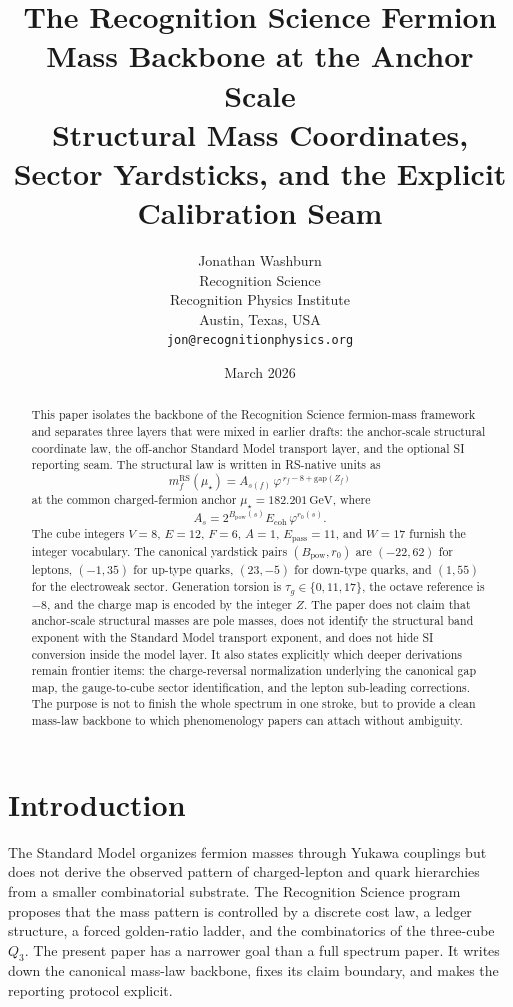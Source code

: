 \documentclass[11pt]{article}
\title{The Recognition Science Fermion Mass Backbone at the Anchor Scale\\
\large Structural Mass Coordinates, Sector Yardsticks, and the Explicit Calibration Seam}
\author{Jonathan Washburn\\
Recognition Science\\
Recognition Physics Institute\\
Austin, Texas, USA\\
\texttt{jon@recognitionphysics.org}}
\date{March 2026}
\newcommand{\phig}{\varphi}
\newcommand{\mustar}{\mu_\star}
\newcommand{\Epass}{E_{\mathrm{pass}}}
\newcommand{\Ecoh}{E_{\mathrm{coh}}}
\newcommand{\Bpow}{B_{\mathrm{pow}}}
\begin{document}
\maketitle

\begin{abstract}
This paper isolates the backbone of the Recognition Science fermion-mass framework and separates three layers that were mixed in earlier drafts: the anchor-scale structural coordinate law, the off-anchor Standard Model transport layer, and the optional SI reporting seam. The structural law is written in RS-native units as
\[
  m_f^{\mathrm{RS}}(\mustar)
  = A_{s(f)}\,\phig^{\,r_f - 8 + \mathrm{gap}(Z_f)}
\]
at the common charged-fermion anchor \(\mustar = 182.201\,\mathrm{GeV}\), where
\[
  A_s = 2^{\Bpow(s)}\Ecoh\,\phig^{r_0(s)}.
\]
The cube integers \(V=8\), \(E=12\), \(F=6\), \(A=1\), \(\Epass=11\), and \(W=17\) furnish the integer vocabulary. The canonical yardstick pairs \((\Bpow,r_0)\) are \((-22,62)\) for leptons, \((-1,35)\) for up-type quarks, \((23,-5)\) for down-type quarks, and \((1,55)\) for the electroweak sector. Generation torsion is \(\tau_g\in\{0,11,17\}\), the octave reference is \(-8\), and the charge map is encoded by the integer \(Z\). The paper does not claim that anchor-scale structural masses are pole masses, does not identify the structural band exponent with the Standard Model transport exponent, and does not hide SI conversion inside the model layer. It also states explicitly which deeper derivations remain frontier items: the charge-reversal normalization underlying the canonical gap map, the gauge-to-cube sector identification, and the lepton sub-leading corrections. The purpose is not to finish the whole spectrum in one stroke, but to provide a clean mass-law backbone to which phenomenology papers can attach without ambiguity.
\end{abstract}

\section{Introduction}

The Standard Model organizes fermion masses through Yukawa couplings but does not derive the observed pattern of charged-lepton and quark hierarchies from a smaller combinatorial substrate. The Recognition Science program proposes that the mass pattern is controlled by a discrete cost law, a ledger structure, a forced golden-ratio ladder, and the combinatorics of the three-cube \(Q_3\). The present paper has a narrower goal than a full spectrum paper. It writes down the canonical mass-law backbone, fixes its claim boundary, and makes the reporting protocol explicit.
\end{document}
